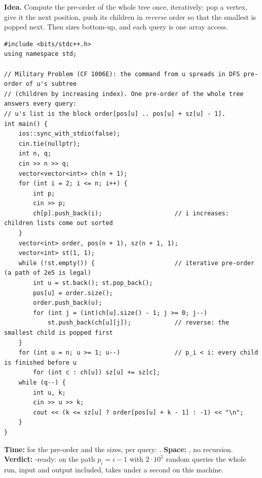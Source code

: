\begin{algorithmbox}
\textbf{Idea.} Compute the pre-order of the whole tree once, iteratively: pop a vertex, give it the next position, push its children in \emph{reverse} order so that the smallest is popped next. Then sizes bottom-up, and each query is one array access.

\begin{lstlisting}[style=cpp]
#include <bits/stdc++.h>
using namespace std;

// Military Problem (CF 1006E): the command from u spreads in DFS pre-order of u's subtree
// (children by increasing index). One pre-order of the whole tree answers every query:
// u's list is the block order[pos[u] .. pos[u] + sz[u] - 1].
int main() {
    ios::sync_with_stdio(false);
    cin.tie(nullptr);
    int n, q;
    cin >> n >> q;
    vector<vector<int>> ch(n + 1);
    for (int i = 2; i <= n; i++) {
        int p;
        cin >> p;
        ch[p].push_back(i);                    // i increases: children lists come out sorted
    }
    vector<int> order, pos(n + 1), sz(n + 1, 1);
    vector<int> st(1, 1);
    while (!st.empty()) {                      // iterative pre-order (a path of 2e5 is legal)
        int u = st.back(); st.pop_back();
        pos[u] = order.size();
        order.push_back(u);
        for (int j = (int)ch[u].size() - 1; j >= 0; j--)
            st.push_back(ch[u][j]);            // reverse: the smallest child is popped first
    }
    for (int u = n; u >= 1; u--)               // p_i < i: every child is finished before u
        for (int c : ch[u]) sz[u] += sz[c];
    while (q--) {
        int u, k;
        cin >> u >> k;
        cout << (k <= sz[u] ? order[pos[u] + k - 1] : -1) << "\n";
    }
}
\end{lstlisting}

\begin{complexitybox}
\textbf{Time:}  for the pre-order and the sizes,  per query: . \textbf{Space:} , no recursion. \textbf{Verdict:} \ac{}-ready: on the path $p_i = i-1$ with $2\cdot10^5$ random queries the whole run, input and output included, takes under a second on this machine.
\end{complexitybox}
\end{algorithmbox}

